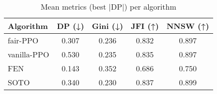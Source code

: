 \begin{table}
\caption{Mean metrics (best |DP|) per algorithm}
\label{tab:best_configs_metrics}
\begin{tabular}{lcccc}
\toprule
Algorithm & DP (↓) & Gini (↓) & JFI (↑) & NNSW (↑) \\
\midrule
fair-PPO & 0.307 & 0.236 & 0.832 & 0.897 \\
vanilla-PPO & 0.530 & 0.235 & 0.835 & 0.897 \\
FEN & 0.143 & 0.352 & 0.686 & 0.750 \\
SOTO & 0.340 & 0.230 & 0.837 & 0.899 \\
\bottomrule
\end{tabular}
\end{table}
